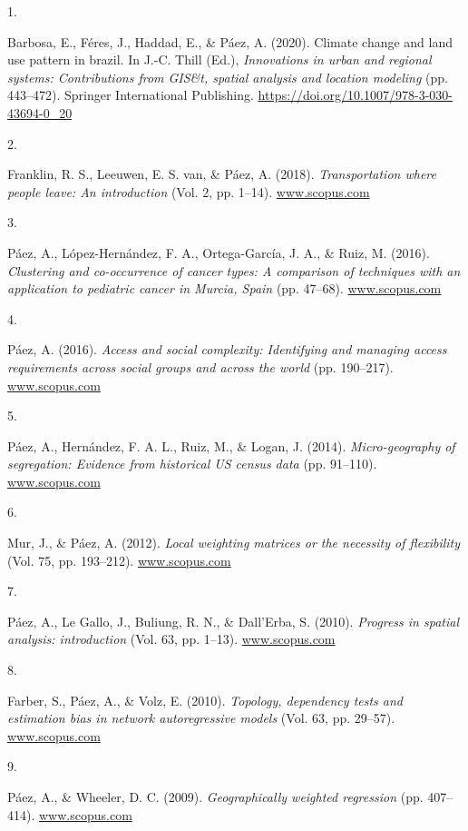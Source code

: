 \documentclass[11pt,a4paper,]{awesome-cv}
\newlength{\cslhangindent}
\newlength{\csllabelwidth}
\newenvironment{CSLReferences}[2] %
 {\begin{list}{}{%
  \setlength{\itemindent}{0pt}
  \setlength{\leftmargin}{0pt}
  \setlength{\parsep}{0pt}
  \ifodd #1
   \setlength{\leftmargin}{\cslhangindent}
   \setlength{\itemindent}{-1\cslhangindent}
  \fi
  \setlength{\itemsep}{#2\baselineskip}}}
 {\end{list}}
\newcommand{\CSLLeftMargin}[1]{\parbox[t]{\csllabelwidth}{\strut#1\strut}}
\newcommand{\CSLRightInline}[1]{\parbox[t]{\linewidth - \csllabelwidth}{\strut#1\strut}}
\begin{document}
\label{refs-fa434c1e835439e2e6e79b47ebeff6e2}
\begin{CSLReferences}{0}{0}
\CSLLeftMargin{1. }%
\CSLRightInline{Barbosa, E., Féres, J., Haddad, E., \& Páez, A. (2020).
Climate change and land use pattern in brazil. In J.-C. Thill (Ed.),
\emph{Innovations in urban and regional systems: Contributions from
GIS\&t, spatial analysis and location modeling} (pp. 443--472). Springer
International Publishing.
\url{https://doi.org/10.1007/978-3-030-43694-0_20}}

\CSLLeftMargin{2. }%
\CSLRightInline{Franklin, R. S., Leeuwen, E. S. van, \& Páez, A. (2018).
\emph{Transportation where people leave: An introduction} (Vol. 2, pp.
1--14). \href{https://www.scopus.com}{www.scopus.com}}

\CSLLeftMargin{3. }%
\CSLRightInline{Páez, A., López-Hernández, F. A., Ortega-García, J. A.,
\& Ruiz, M. (2016). \emph{Clustering and co-occurrence of cancer types:
A comparison of techniques with an application to pediatric cancer in
Murcia, Spain} (pp. 47--68).
\href{https://www.scopus.com}{www.scopus.com}}

\CSLLeftMargin{4. }%
\CSLRightInline{Páez, A. (2016). \emph{Access and social complexity:
Identifying and managing access requirements across social groups and
across the world} (pp. 190--217).
\href{https://www.scopus.com}{www.scopus.com}}

\CSLLeftMargin{5. }%
\CSLRightInline{Páez, A., Hernández, F. A. L., Ruiz, M., \& Logan, J.
(2014). \emph{Micro-geography of segregation: Evidence from historical
US census data} (pp. 91--110).
\href{https://www.scopus.com}{www.scopus.com}}

\CSLLeftMargin{6. }%
\CSLRightInline{Mur, J., \& Páez, A. (2012). \emph{Local weighting
matrices or the necessity of flexibility} (Vol. 75, pp. 193--212).
\href{https://www.scopus.com}{www.scopus.com}}

\CSLLeftMargin{7. }%
\CSLRightInline{Páez, A., Le Gallo, J., Buliung, R. N., \& Dall'Erba, S.
(2010). \emph{Progress in spatial analysis: introduction} (Vol. 63, pp.
1--13). \href{https://www.scopus.com}{www.scopus.com}}

\CSLLeftMargin{8. }%
\CSLRightInline{Farber, S., Páez, A., \& Volz, E. (2010).
\emph{Topology, dependency tests and estimation bias in network
autoregressive models} (Vol. 63, pp. 29--57).
\href{https://www.scopus.com}{www.scopus.com}}

\CSLLeftMargin{9. }%
\CSLRightInline{Páez, A., \& Wheeler, D. C. (2009). \emph{Geographically
weighted regression} (pp. 407--414).
\href{https://www.scopus.com}{www.scopus.com}}

\end{CSLReferences}
\end{document}
